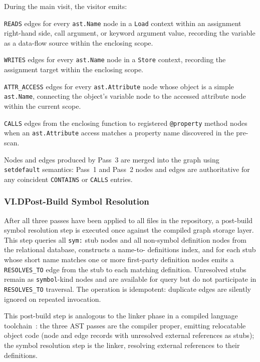 \documentclass[12pt]{article}
\begin{document}
During the main visit, the visitor emits:

\texttt{READS} edges for every \texttt{ast.Name} node in a \texttt{Load}
context within an assignment right-hand side, call argument, or keyword argument
value, recording the variable as a data-flow source within the enclosing scope.

\texttt{WRITES} edges for every \texttt{ast.Name} node in a \texttt{Store}
context, recording the assignment target within the enclosing scope.

\texttt{ATTR\_ACCESS} edges for every \texttt{ast.Attribute} node whose object
is a simple \texttt{ast.Name}, connecting the object's variable node to the
accessed attribute node within the current scope.

\texttt{CALLS} edges from the enclosing function to registered \texttt{@property}
method nodes when an \texttt{ast.Attribute} access matches a property name
discovered in the pre-scan.

Nodes and edges produced by Pass~3 are merged into the graph using
\texttt{setdefault} semantics: Pass~1 and Pass~2 nodes and edges are
authoritative for any coincident \texttt{CONTAINS} or \texttt{CALLS} entries.

\subsubsection{VI.D\quad Post-Build Symbol Resolution}

After all three passes have been applied to all files in the repository, a
post-build symbol resolution step is executed once against the compiled graph
storage layer. This step queries all \texttt{sym:} stub nodes and all
non-symbol definition nodes from the relational database, constructs a name-to-
definitions index, and for each stub whose short name matches one or more
first-party definition nodes emits a \texttt{RESOLVES\_TO} edge from the stub to
each matching definition. Unresolved stubs remain as \texttt{symbol}-kind nodes
and are available for query but do not participate in \texttt{RESOLVES\_TO}
traversal. The operation is idempotent: duplicate edges are silently ignored on
repeated invocation.

This post-build step is analogous to the linker phase in a compiled language
toolchain~\cite{aho2006compilers}: the three AST passes are the compiler proper,
emitting relocatable object code (node and edge records with unresolved external
references as stubs); the symbol resolution step is the linker, resolving
external references to their definitions.
\end{document}
